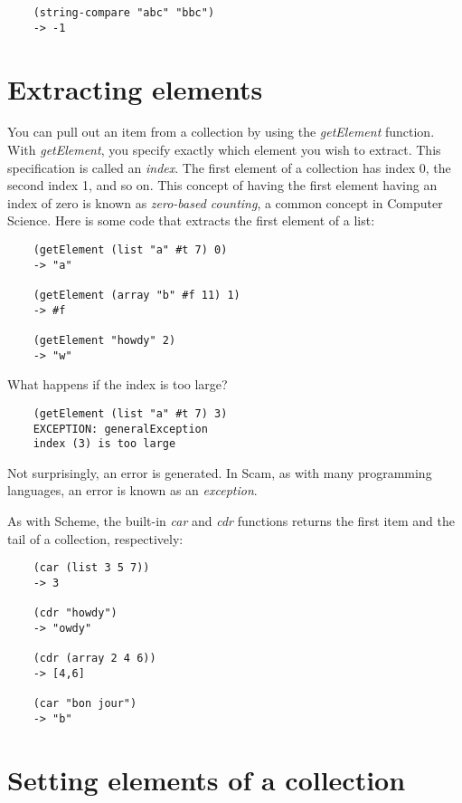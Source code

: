 \begin{verbatim}
    (string-compare "abc" "bbc")
    -> -1
\end{verbatim}

\section{Extracting elements}

You can pull out an item from a collection
by using the
{\it getElement} function.
With {\it getElement},
you specify exactly which element
you wish to extract. This specification is called an
{\it index}. The first element of a collection has index 0, the second
index 1, and so on. This concept of having the first element having
an index of zero is known as {\it zero-based counting}, a common concept
in Computer Science. Here is some code that extracts the first element
of a list:

\begin{verbatim}
    (getElement (list "a" #t 7) 0)
    -> "a"

    (getElement (array "b" #f 11) 1)
    -> #f

    (getElement "howdy" 2)
    -> "w"
\end{verbatim}

What happens if the index is too large?

\begin{verbatim}
    (getElement (list "a" #t 7) 3)
    EXCEPTION: generalException
    index (3) is too large
\end{verbatim}

Not surprisingly, an error is generated.
In Scam, as with many programming languages, an error is known
as an {\it exception}.

As with Scheme, the built-in {\it car} and {\it cdr} functions
returns the first item and the tail of a collection, respectively:

\begin{verbatim}
    (car (list 3 5 7))
    -> 3

    (cdr "howdy")
    -> "owdy"

    (cdr (array 2 4 6))
    -> [4,6]

    (car "bon jour")
    -> "b"
\end{verbatim}

\section{Setting elements of a collection}

